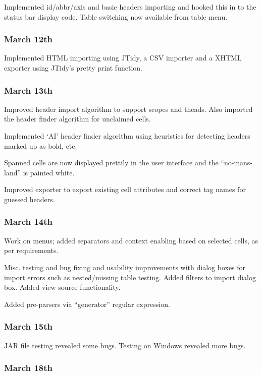 Implemented id/abbr/axis and basic headers importing and hooked this in to
the status bar display code. Table switching now available from table menu.

\subsubsection{March 12th}

Implemented HTML importing using JTidy, a CSV importer and a XHTML exporter
using JTidy's pretty print function.

\subsubsection{March 13th}

Improved header import algorithm to support scopes and theads. Also imported
the header finder algorithm for unclaimed cells. 

Implemented `AI' header finder algorithm using heuristics for detecting
headers marked up as bold, etc.

Spanned cells are now displayed prettily in the user interface and the ``no-mans-land''
is painted white.

Improved exporter to export existing cell attributes and correct tag names
for guessed headers.

\subsubsection{March 14th}

Work on menus; added separators and context enabling based on selected cells, 
as per requirements.

Misc. testing and bug fixing and usability improvements with dialog boxes for
import errors such as nested/missing table testing. Added filters to import
dialog box. Added view source functionality.

Added pre-parsers via ``generator'' regular expression.

\subsubsection{March 15th}

JAR file testing revealed some bugs. Testing on Windows revealed more bugs.

\subsubsection{March 18th}

